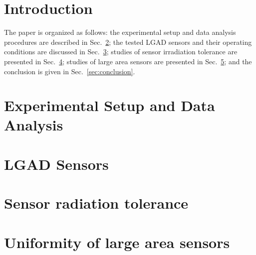 \documentclass[preprint,1p]{elsarticle}
\begin{document}
\tableofcontents


\section{Introduction} 


The paper is organized as follows: the experimental setup and data analysis
procedures are described in Sec.~\ref{sec:setup}; the tested LGAD sensors and
their operating conditions are discussed in Sec.~\ref{sec:sensors}; 
studies of sensor irradiation tolerance are presented in 
Sec.~\ref{sec:irradiationStudies}; studies of large area sensors are presented 
in Sec.~\ref{sec:largeAreaStudies}; and the conclusion is given in Sec.~\ref{sec:conclusion}.

\section{Experimental Setup and Data Analysis} 
\label{sec:setup}




\section{LGAD Sensors}
\label{sec:sensors}




\section{Sensor radiation tolerance}
\label{sec:irradiationStudies}


\section{Uniformity of large area sensors}
\label{sec:largeAreaStudies}

\end{document}
